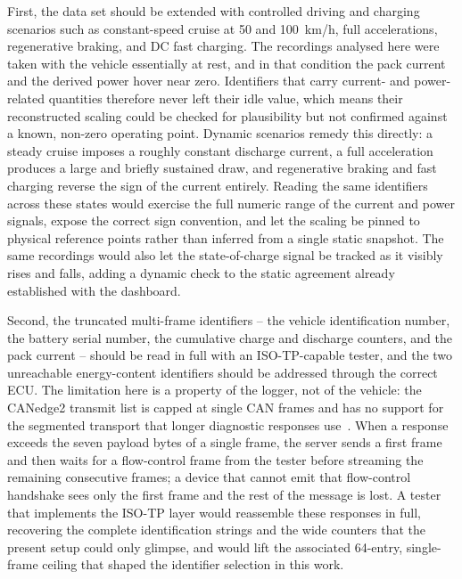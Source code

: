 \documentclass[11pt,a4paper,oneside,parskip=half]{scrreprt}
\begin{document}
First, the data set should be extended with controlled driving and charging scenarios such as constant-speed cruise at 50 and 100~km/h, full accelerations, regenerative braking, and DC fast charging. The recordings analysed here were taken with the vehicle essentially at rest, and in that condition the pack current and the derived power hover near zero. Identifiers that carry current- and power-related quantities therefore never left their idle value, which means their reconstructed scaling could be checked for plausibility but not confirmed against a known, non-zero operating point. Dynamic scenarios remedy this directly: a steady cruise imposes a roughly constant discharge current, a full acceleration produces a large and briefly sustained draw, and regenerative braking and fast charging reverse the sign of the current entirely. Reading the same identifiers across these states would exercise the full numeric range of the current and power signals, expose the correct sign convention, and let the scaling be pinned to physical reference points rather than inferred from a single static snapshot. The same recordings would also let the state-of-charge signal be tracked as it visibly rises and falls, adding a dynamic check to the static agreement already established with the dashboard.

Second, the truncated multi-frame identifiers -- the vehicle identification number, the battery serial number, the cumulative charge and discharge counters, and the pack current -- should be read in full with an ISO-TP-capable tester, and the two unreachable energy-content identifiers should be addressed through the correct ECU. The limitation here is a property of the logger, not of the vehicle: the CANedge2 transmit list is capped at single CAN frames and has no support for the segmented transport that longer diagnostic responses use~\cite{iso15765}. When a response exceeds the seven payload bytes of a single frame, the server sends a first frame and then waits for a flow-control frame from the tester before streaming the remaining consecutive frames; a device that cannot emit that flow-control handshake sees only the first frame and the rest of the message is lost. A tester that implements the ISO-TP layer would reassemble these responses in full, recovering the complete identification strings and the wide counters that the present setup could only glimpse, and would lift the associated 64-entry, single-frame ceiling that shaped the identifier selection in this work.
\end{document}
